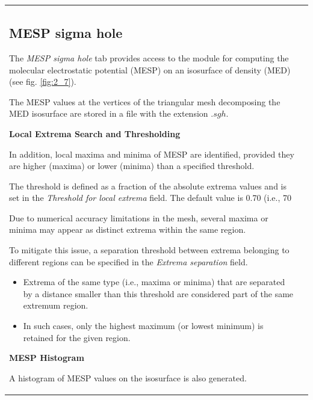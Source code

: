 \documentclass[10pt]{article}
\begin{document}
\vspace*{5mm}
\begin{tabular}{lr}
\hspace*{-3mm}
\begin{minipage}{.6\linewidth}


\subsection{MESP sigma hole \label{sec:2.7}\index{MESP sigma hole}}

The {\it MESP sigma hole} tab provides access to the module for computing
the molecular electrostatic potential (MESP) on an isosurface
of density (MED) (see fig. \ref{fig:2_7}).

The MESP values at the vertices of the triangular mesh
decomposing the MED isosurface are stored in a file
with the extension $.sgh$.

\vspace*{3mm}
{\bf Local Extrema Search and Thresholding}
\vspace*{3mm}

In addition, local maxima and minima of MESP are identified,
provided they are higher (maxima) or lower (minima)
than a specified threshold.

The threshold is defined as a fraction
of the absolute extrema values and is set in the {\it Threshold for local extrema} field.
The default value is 0.70 (i.e., 70%

Due to numerical accuracy limitations in the mesh,
several maxima or minima may appear as distinct extrema
within the same region.

To mitigate this issue, a separation threshold
between extrema belonging to different regions
can be specified in the {\it Extrema separation} field.

\begin{itemize}
\item Extrema of the same type (i.e., maxima or minima)
that are separated by a distance smaller than this threshold
are considered part of the same extremum region.
\item In such cases, only the highest maximum (or lowest minimum)
is retained for the given region.
\end{itemize}

\vspace*{3mm}
{\bf MESP Histogram}
\vspace*{3mm}

A histogram\index{MESP sigma hole!histogram}
of MESP values on the isosurface is also generated.


\end{minipage}
\end{tabular}
\end{document}
